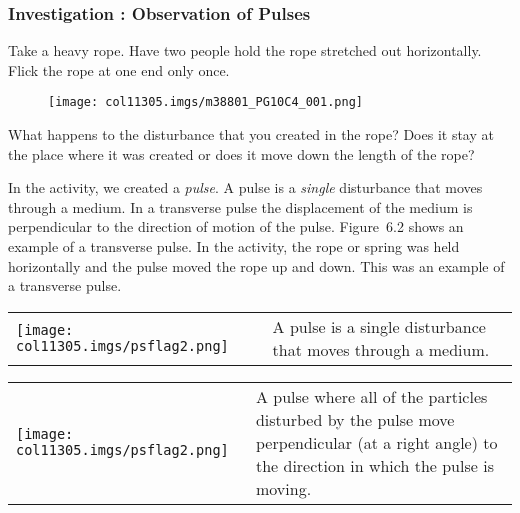             \subsubsection{  Investigation : Observation of Pulses }
            \nopagebreak
      \label{m38801*id312873}Take a heavy rope. Have two people hold the rope stretched out horizontally. Flick the rope at one end only once.\par 
      \label{m38801*id312879}
    \setcounter{subfigure}{0}
	\begin{figure}[H] %
    \begin{center}
    \label{m38801*id312882!!!underscore!!!media}\label{m38801*id312882!!!underscore!!!printimage}\texttt{[image: col11305.imgs/m38801\_PG10C4\_001.png]} %
      \vspace{2pt}
    \vspace{.1in}
    \end{center}
 \end{figure}       
      \par 
      \label{m38801*id312888}What happens to the disturbance that you created in the rope? Does it stay at the place where it was created or does it move down the length of the rope? \par 
      \label{m38801*id312898}In the activity, we created a \textsl{pulse}. A pulse is a \textsl{single} disturbance that moves through a medium. In a transverse pulse the displacement of the medium is perpendicular to the direction of motion of the pulse. Figure~6.2 shows an example of a transverse pulse. In the activity, the rope or spring was held horizontally and the pulse moved the rope up and down. This was an example of a transverse pulse.\par 
\label{m38801*fhsst!!!underscore!!!id71}\begin{definition}
	  \begin{tabular*}{15 cm}{m{15 mm}m{}}
	\hspace*{-50pt}  \texttt{[image: col11305.imgs/psflag2.png]}   & \Definition{   \label{id2434846}\textbf{ Pulse }} { \label{m38801*meaningfhsst!!!underscore!!!id71}
      \label{m38801*id312926}A pulse is a single disturbance that moves through a medium. \par 
       } 
      \end{tabular*}
      \end{definition}
\label{m38801*fhsst!!!underscore!!!id72}\begin{definition}
	  \begin{tabular*}{15 cm}{m{15 mm}m{}}
	\hspace*{-50pt}  \texttt{[image: col11305.imgs/psflag2.png]}   & \Definition{   \label{id2434870}\textbf{ Transverse Pulse }} { \label{m38801*meaningfhsst!!!underscore!!!id72}
      \label{m38801*id3129262}A pulse where all of the particles disturbed by the pulse move perpendicular (at a right angle) to the direction in which the pulse is moving. \par 
       } 
      \end{tabular*}
      \end{definition}
      \label{m38801*uid1}
